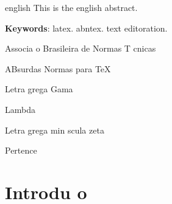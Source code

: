 \documentclass{article}
\begin{document}
\begin{resumo}[Abstract]
 \begin{otherlanguage*}{english}
   This is the english abstract.

   \vspace{\onelineskip}
 
   \noindent 
   \textbf{Keywords}: latex. abntex. text editoration.
 \end{otherlanguage*}
\end{resumo}





\listofquadros*





\begin{siglas}
  \item[ABNT] Associa o Brasileira de Normas T cnicas
  \item[abnTeX] ABsurdas Normas para TeX
\end{siglas}

\begin{simbolos}
  \item[$ \Gamma $] Letra grega Gama
  \item[$ \Lambda $] Lambda
  \item[$ \zeta $] Letra grega min scula zeta
  \item[$ \in $] Pertence
\end{simbolos}






\textual

\chapter{Introdu o}
\end{document}
